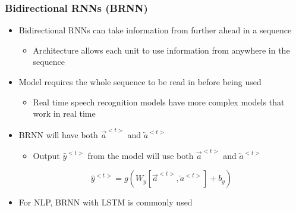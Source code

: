 \documentclass[12pt, letterpaper]{article}
\begin{document}
    \subsubsection{Bidirectional RNNs (BRNN)}
    \begin{itemize}
        \item Bidirectional RNNs can take information from further ahead in a sequence
        \begin{itemize}
            \item Architecture allows each unit to use information from anywhere in the sequence
        \end{itemize}
        \item Model requires the whole sequence to be read in before being used
        \begin{itemize}
            \item Real time speech recognition models have more complex models that work in real time
        \end{itemize}
        \item BRNN will have both $\overrightarrow{a}^{<t>}$ and $\overleftarrow{a}^{<t>}$ 
        \begin{itemize}
            \item Output $\hat{y}^{<t>}$ from the model will use both $\overrightarrow{a}^{<t>}$ and $\overleftarrow{a}^{<t>}$
        \end{itemize}
        $$\hat{y}^{<t>}=g(W_y[\overrightarrow{a}^{<t>},\overleftarrow{a}^{<t>}]+b_y)$$
        \item For NLP, BRNN with LSTM is commonly used
    \end{itemize}
    
\end{document}
